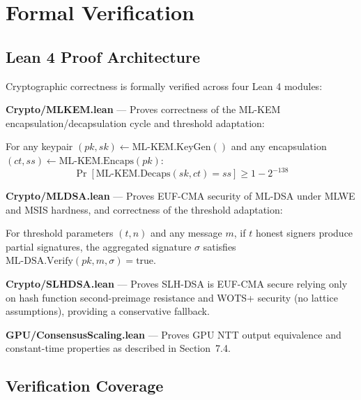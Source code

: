 \section{Formal Verification}


\subsection{Lean 4 Proof Architecture}

Cryptographic correctness is formally verified across four Lean 4 modules:

\textbf{Crypto/MLKEM.lean} --- Proves correctness of the ML-KEM encapsulation/decapsulation cycle and threshold adaptation:

\begin{theorem}
For any keypair $(pk, sk) \leftarrow \text{ML-KEM.KeyGen}()$ and any encapsulation $(ct, ss) \leftarrow \text{ML-KEM.Encaps}(pk)$:
\[
\Pr[\text{ML-KEM.Decaps}(sk, ct) = ss] \geq 1 - 2^{-138}
\]
\end{theorem}

\textbf{Crypto/MLDSA.lean} --- Proves EUF-CMA security of ML-DSA under MLWE and MSIS hardness, and correctness of the threshold adaptation:

\begin{theorem}
For threshold parameters $(t, n)$ and any message $m$, if $t$ honest signers produce partial signatures, the aggregated signature $\sigma$ satisfies $\text{ML-DSA.Verify}(pk, m, \sigma) = \text{true}$.
\end{theorem}

\textbf{Crypto/SLHDSA.lean} --- Proves SLH-DSA is EUF-CMA secure relying only on hash function second-preimage resistance and WOTS+ security (no lattice assumptions), providing a conservative fallback.

\textbf{GPU/ConsensusScaling.lean} --- Proves GPU NTT output equivalence and constant-time properties as described in Section~7.4.

\subsection{Verification Coverage}

